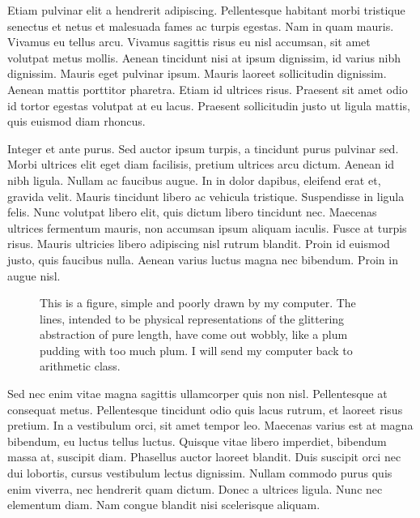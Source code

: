 \documentclass[9pt]{memoir}
\begin{document}
Etiam pulvinar elit a hendrerit adipiscing. Pellentesque habitant morbi tristique senectus et netus et malesuada fames ac turpis egestas. Nam in quam mauris. Vivamus eu tellus arcu. Vivamus sagittis risus eu nisl accumsan, sit amet volutpat metus mollis. Aenean tincidunt nisi at ipsum dignissim, id varius nibh dignissim. Mauris eget pulvinar ipsum. Mauris laoreet sollicitudin dignissim. Aenean mattis porttitor pharetra. Etiam id ultrices risus. Praesent sit amet odio id tortor egestas volutpat at eu lacus. Praesent sollicitudin justo ut ligula mattis, quis euismod diam rhoncus.

Integer et ante purus. Sed auctor ipsum turpis, a tincidunt purus pulvinar sed. Morbi ultrices elit eget diam facilisis, pretium ultrices arcu dictum. Aenean id nibh ligula. Nullam ac faucibus augue. In in dolor dapibus, eleifend erat et, gravida velit. Mauris tincidunt libero ac vehicula tristique. Suspendisse in ligula felis. Nunc volutpat libero elit, quis dictum libero tincidunt nec. Maecenas ultrices fermentum mauris, non accumsan ipsum aliquam iaculis. Fusce at turpis risus. Mauris ultricies libero adipiscing nisl rutrum blandit. Proin id euismod justo, quis faucibus nulla. Aenean varius luctus magna nec bibendum. Proin in augue nisl.

\begin{figure}
\begin{adjustwidth*}{-1in}{0pt}
\centering
{}
\end{adjustwidth*}
\caption{This is a figure, simple and poorly drawn by my computer. The lines, intended to be physical representations of the glittering abstraction of pure length, have come out wobbly, like a plum pudding with too much plum. I will send my computer back to arithmetic class.}
\end{figure}

Sed nec enim vitae magna sagittis ullamcorper quis non nisl. Pellentesque at consequat metus. Pellentesque tincidunt odio quis lacus rutrum, et laoreet risus pretium. In a vestibulum orci, sit amet tempor leo. Maecenas varius est at magna bibendum, eu luctus tellus luctus. Quisque vitae libero imperdiet, bibendum massa at, suscipit diam. Phasellus auctor laoreet blandit. Duis suscipit orci nec dui lobortis, cursus vestibulum lectus dignissim. Nullam commodo purus quis enim viverra, nec hendrerit quam dictum. Donec a ultrices ligula. Nunc nec elementum diam. Nam congue blandit nisi scelerisque aliquam.
\end{document}
